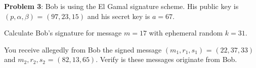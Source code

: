 \documentclass[12pt,letterpaper,final]{report}
\begin{document}
\bigskip

\noindent\textbf{Problem 3}: Bob is using the El Gamal signature scheme. His public key is $(p, \alpha, \beta)$ = $(97, 23, 15)$ and his secret key is $a = 67$.
\begin{alphlist}
	\item\indent Calculate Bob's signature for message $m = 17$ with ephemeral random $k = 31$.
	\item\indent You receive allegedly from Bob the signed message $(m_{1}, r_{1}, s_{1})$ = $(22, 37, 33)$ and $m_{2}, r_{2}, s_{2}$ = $(82, 13, 65)$. Verify is these messages originate from Bob.
\end{alphlist}
\end{document}
